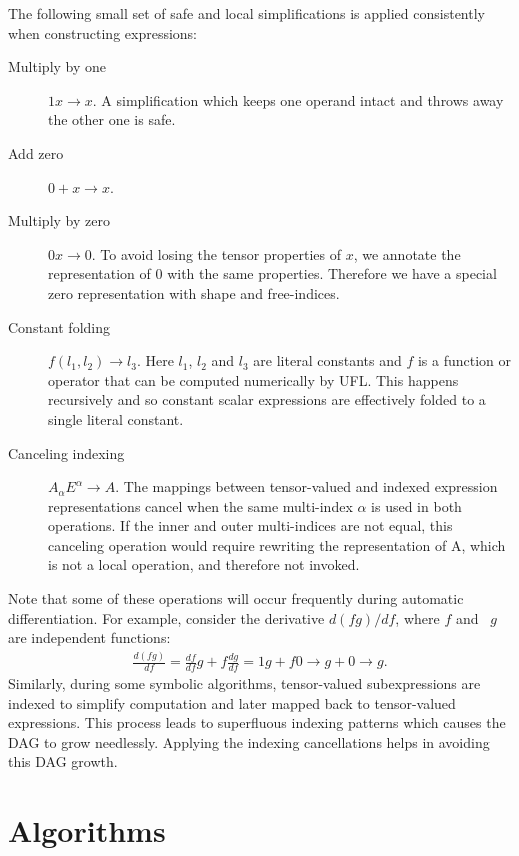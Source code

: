 \documentclass[prodmode,acmtoms]{acmsmall}
\begin{document}
The following small set of safe and local simplifications is applied
consistently when constructing expressions:
\begin{description}
\item[Multiply by one]
  $1 x \rightarrow x$.
  A simplification which keeps one operand intact and throws away the
  other one is safe.

\item[Add zero]
  $0 + x \rightarrow x$.

\item[Multiply by zero]
  $0 x \rightarrow 0$.
  To avoid losing the tensor properties of $x$, we annotate the
  representation of $0$ with the same properties. Therefore we have a
  special zero representation with shape and free-indices.

\item[Constant folding]
  $f(l_1, l_2) \rightarrow l_3$.
  Here $l_1$, $l_2$ and $l_3$ are literal constants and $f$ is a function
  or operator that can be computed numerically by UFL. This happens
  recursively and so constant scalar expressions are effectively folded
  to a single literal constant.

\item[Canceling indexing]
  $A_\alpha E^\alpha \rightarrow A$.
  The mappings between tensor-valued and indexed expression
  representations cancel when the same multi-index $\alpha$ is used in
  both operations. If the inner and outer multi-indices are not equal,
  this canceling operation would require rewriting the representation
  of A, which is not a local operation, and therefore not invoked.
\end{description}
Note that some of these operations will occur frequently during automatic
differentiation. For example, consider the derivative $d(fg) / df$,
where $f$ and~ $g$ are independent functions:
\begin{align}
  \frac{d(fg)}{df}
      = \frac{df}{df} g + f \frac{dg}{df}
      = 1 g + f 0 \rightarrow g + 0 \rightarrow g.
\end{align}
Similarly, during some symbolic algorithms, tensor-valued
subexpressions are indexed to simplify computation and later mapped back to tensor-valued
expressions. This process leads to superfluous indexing patterns which
causes the DAG to grow needlessly. Applying the indexing cancellations
helps in avoiding this DAG growth.

\section{Algorithms}
\label{sec:algorithms}
\end{document}
